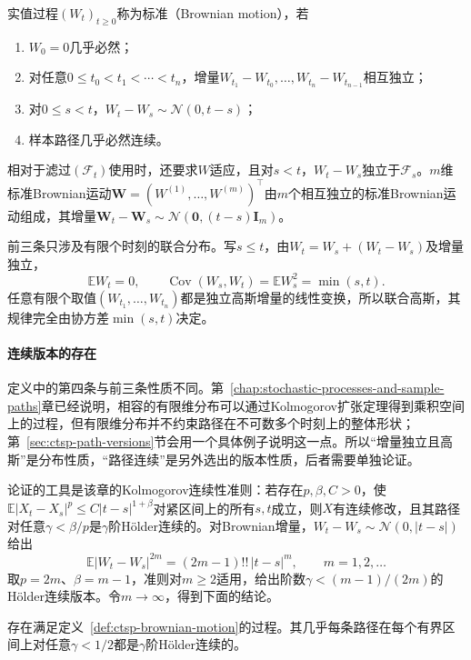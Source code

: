 \begin{definition}[标准Brownian运动]
  \label{def:ctsp-brownian-motion}
  实值过程$(W_t)_{t\geq0}$称为标准（Brownian motion），若
  \begin{enumerate}
    \item $W_0=0$几乎必然；
    \item 对任意$0\leq t_0<t_1<\cdots<t_n$，增量$W_{t_1}-W_{t_0},\ldots,W_{t_n}-W_{t_{n-1}}$相互独立；
    \item 对$0\leq s<t$，$W_t-W_s\sim\mathcal N(0,t-s)$；
    \item 样本路径几乎必然连续。
  \end{enumerate}
  相对于滤过$(\mathcal F_t)$使用时，还要求$W$适应，且对$s<t$，$W_t-W_s$独立于$\mathcal F_s$。$m$维标准Brownian运动$\bm W=(W^{(1)},\ldots,W^{(m)})^\top$由$m$个相互独立的标准Brownian运动组成，其增量$\bm W_t-\bm W_s\sim\mathcal N(\bm0,(t-s)\bm I_m)$。
\end{definition}

前三条只涉及有限个时刻的联合分布。写$s\leq t$，由$W_t=W_s+(W_t-W_s)$及增量独立，
\begin{equation}
  \mathbb E W_t=0,\qquad
  \operatorname{Cov}(W_s,W_t)=\mathbb EW_s^2=\min(s,t).
  \label{eq:ctsp-brownian-covariance}
\end{equation}
任意有限个取值$(W_{t_1},\ldots,W_{t_n})$都是独立高斯增量的线性变换，所以联合高斯，其规律完全由协方差$\min(s,t)$决定。

\paragraph{连续版本的存在}
定义中的第四条与前三条性质不同。第~\ref{chap:stochastic-processes-and-sample-paths}章已经说明，相容的有限维分布可以通过Kolmogorov扩张定理得到乘积空间上的过程，但有限维分布并不约束路径在不可数多个时刻上的整体形状；第~\ref{sec:ctsp-path-versions}节会用一个具体例子说明这一点。所以“增量独立且高斯”是分布性质，“路径连续”是另外选出的版本性质，后者需要单独论证。

论证的工具是该章的Kolmogorov连续性准则：若存在$p,\beta,C>0$，使$\mathbb E|X_t-X_s|^p\leq C|t-s|^{1+\beta}$对紧区间上的所有$s,t$成立，则$X$有连续修改，且其路径对任意$\gamma<\beta/p$是$\gamma$阶Hölder连续的。对Brownian增量，$W_t-W_s\sim\mathcal N(0,|t-s|)$给出
\[
  \mathbb E|W_t-W_s|^{2m}=(2m-1)!!\,|t-s|^m,\qquad m=1,2,\ldots
\]
取$p=2m$、$\beta=m-1$，准则对$m\geq2$适用，给出阶数$\gamma<(m-1)/(2m)$的Hölder连续版本。令$m\to\infty$，得到下面的结论。

\begin{theorem}[Brownian运动的存在与路径正则性]
  \label{thm:ctsp-brownian-existence}
  存在满足定义~\ref{def:ctsp-brownian-motion}的过程。其几乎每条路径在每个有界区间上对任意$\gamma<1/2$都是$\gamma$阶Hölder连续的。
\end{theorem}

